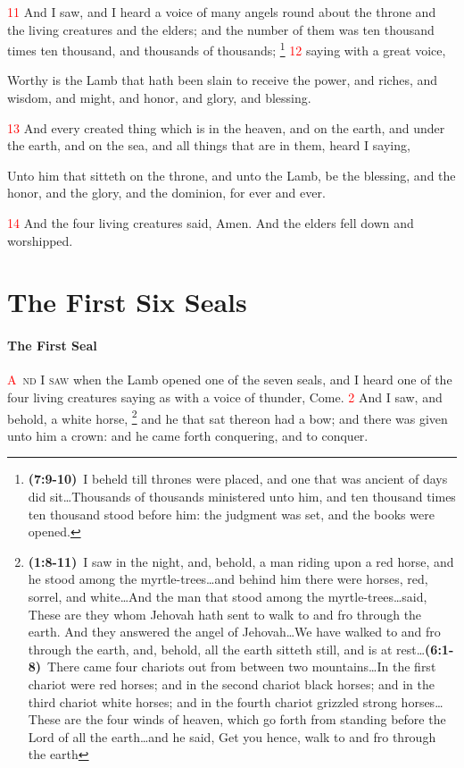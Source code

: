 \documentclass[12pt,twoside]{memoir}
\newcommand{\cbibleref}[3]{\textbf{\ibibleverse[textit]{#1}(#2)}\ {#3}}
\newcommand{\cbiblechvs}[3]{\textbf{\ibiblechvs[textit]{#1}(#2)}\ {#3}}
\newcommand{\cbiblefoot}[3]{\footnote{\cbibleref{#1}{#2}{#3}}}
\newcommand{\cbiblefootduosb}[5]{\footnote{\cbibleref{#1}{#2}{#3}\ldots \cbiblechvs{#1}{#4}{#5}}} %
\newcommand{\vnum}[1]{\textcolor{red}{\normalsize{#1}}}
\begin{document}
\vnum{11} And I saw, and I heard a voice of many angels round about the throne and the living creatures and the elders; and the number of them was ten thousand times ten thousand, and thousands of thousands;%
	\cbiblefoot{Daniel}{7:9-10}{I beheld till thrones were placed, and one that was ancient of days did sit\ldots Thousands of thousands ministered unto him, and ten thousand times ten thousand stood before him: the judgment was set, and the books were opened.}
\vnum{12} saying with a great voice,

Worthy is the Lamb that hath been slain to receive the power, and riches, and wisdom, and might, and honor, and glory, and blessing.

\vnum{13} And every created thing which is in the heaven, and on the earth, and under the earth, and on the sea, and all things that are in them, heard I saying,

Unto him that sitteth on the throne, and unto the Lamb, be the blessing, and the honor, and the glory, and the dominion, for ever and ever.

\vnum{14} And the four living creatures said, Amen. And the elders fell down and worshipped.


\chapter{The First Six Seals}
\subsubsection*{The First Seal}
\lettrine[lines=3]{\textcolor{red}{A}}{\ nd I saw} when the Lamb opened one of the seven seals, and I heard one of the four living creatures saying as with a voice of thunder, Come. 
\vnum{2} And I saw, and behold, a white horse,%
	\cbiblefootduosb{Zechariah}{1:8-11}{I saw in the night, and, behold, a man riding upon a red horse, and he stood among the myrtle-trees\ldots and behind him there were horses, red, sorrel, and white\ldots And the man that stood among the myrtle-trees\ldots said, These are they whom Jehovah hath sent to walk to and fro through the earth. And they answered the angel of Jehovah\ldots We have walked to and fro through the earth, and, behold, all the earth sitteth still, and is at rest}%
					{6:1-8}{There came four chariots out from between two mountains\ldots In the first chariot were red horses; and in the second chariot black horses; and in the third chariot white horses; and in the fourth chariot grizzled strong horses\ldots These are the four winds of heaven, which go forth from standing before the Lord of all the earth\ldots and he said, Get you hence, walk to and fro through the earth}
 and he that sat thereon had a bow; and there was given unto him a crown: and he came forth conquering, and to conquer.
\end{document}
